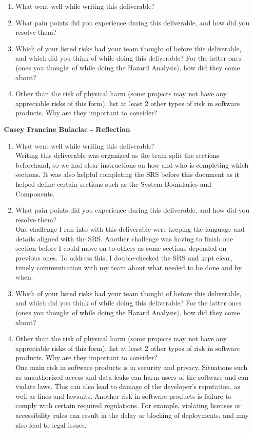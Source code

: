 \documentclass{article}
\begin{document}
\begin{enumerate}
    \item What went well while writing this deliverable? 
    \item What pain points did you experience during this deliverable, and how
    did you resolve them?
    \item Which of your listed risks had your team thought of before this
    deliverable, and which did you think of while doing this deliverable? For
    the latter ones (ones you thought of while doing the Hazard Analysis), how
    did they come about?
    \item Other than the risk of physical harm (some projects may not have any
    appreciable risks of this form), list at least 2 other types of risk in
    software products. Why are they important to consider?
\end{enumerate}

\textbf{Casey Francine Bulaclac - Reflection}
\begin{enumerate}
    \item What went well while writing this deliverable? \\[1ex]
    Writing this deliverable was organized as the team split the sections beforehand, so we had clear instructions on how and who is completing which sections. It 
    was also helpful completing the SRS before this document as it helped define certain sections such as the System Boundaries and Components. 
    \item What pain points did you experience during this deliverable, and how
    did you resolve them?\\[1ex]
    One challenge I ran into with this deliverable were keeping the language and details aligned with the SRS. Another challenge was having to finish one section before I could move on 
    to others as some sections depended on previous ones. To address this, I double-checked the SRS and kept clear, timely communication with my team about what needed to be done and by when.
    \item Which of your listed risks had your team thought of before this
    deliverable, and which did you think of while doing this deliverable? For
    the latter ones (ones you thought of while doing the Hazard Analysis), how
    did they come about? \\
    \item Other than the risk of physical harm (some projects may not have any
    appreciable risks of this form), list at least 2 other types of risk in
    software products. Why are they important to consider?\\[1ex]
    One main risk in software products is in security and privacy. Situations such as unauthorized access and data leaks can harm users of the software and 
    can violate laws. This can also lead to damage of the developer's reputation, as well as fines and lawsuits. Another risk in software products is failure to comply with 
    certain required regulations. For example, violating licenses or accessibility rules can result in the delay or blocking of deployments, and may also lead 
    to legal issues. 
\end{enumerate}
\end{document}

